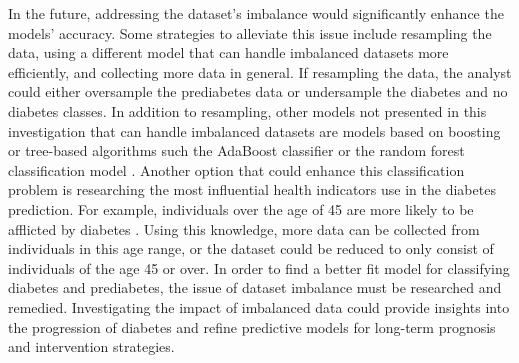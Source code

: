 \documentclass[journal]{IEEEtran}
\begin{document}
In the future, addressing the dataset's imbalance would significantly enhance the models' accuracy. Some strategies to alleviate this issue include resampling the data, using a different model that can handle imbalanced datasets more efficiently, and collecting more data in general. If resampling the data, the analyst could either oversample the prediabetes data or undersample the diabetes and no diabetes classes. In addition to resampling, other models not presented in this investigation that can handle imbalanced datasets are models based on boosting or tree-based algorithms such the AdaBoost classifier or the random forest classification model \cite{b14}. Another option that could enhance this classification problem is researching the most influential health indicators use in the diabetes prediction. For example, individuals over the age of 45 are more likely to be afflicted by diabetes \cite{b1}. Using this knowledge, more data can be collected from individuals in this age range, or the dataset could be reduced to only consist of individuals of the age 45 or over. In order to find a better fit model for classifying diabetes and prediabetes, the issue of dataset imbalance must be researched and remedied. Investigating the impact of imbalanced data could provide insights into the progression of diabetes and refine predictive models for long-term prognosis and intervention strategies.
\end{document}
